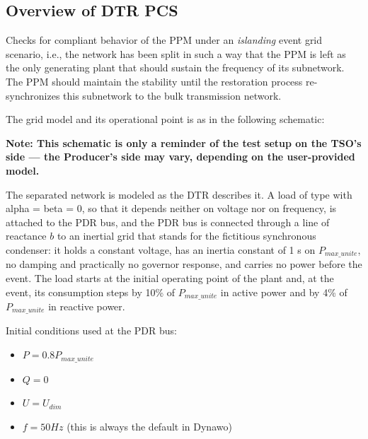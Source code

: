     \subsection{Overview of DTR PCS \DTRPcs}

    Checks for compliant behavior of the PPM under an \emph{islanding} event grid
    scenario, i.e., the network has been split in such a way that the PPM is left as
    the only generating plant that should sustain the frequency of its
    subnetwork. The PPM should maintain the stability until the restoration process
    re-synchronizes this subnetwork to the bulk transmission network.

    The grid model and its operational point is as in the following schematic:
    \begin{center}
        
    \end{center}
    \begin{center}
        \small \textbf{Note: This schematic is only a reminder of the test setup on the TSO's
        side --- the Producer's side may vary, depending on the user-provided model.}
    \end{center}

    The separated network is modeled as the DTR describes it. A load of type
     with alpha = beta = 0, so that it depends neither on
    voltage nor on frequency, is attached to the PDR bus, and the PDR bus is
    connected through a line of reactance $b$ to an inertial grid that stands
    for the fictitious synchronous condenser: it holds a constant voltage, has
    an inertia constant of 1 s on $P_{max\_unite}$, no damping and practically
    no governor response, and carries no power before the event. The load
    starts at the initial operating point of the plant and, at the event, its
    consumption steps by 10\% of $P_{max\_unite}$ in active power and by 4\%
    of $P_{max\_unite}$ in reactive power.

    \begin{description}
        \item Initial conditions used at the PDR bus:
        \begin{itemize}
            \item $P = 0.8 P_{max\_unite}$
            \item $Q = 0$
            \item $U = U_{dim}$
            \item $f = 50 Hz$ (this is always the default in Dynawo)
        \end{itemize}
    \end{description}

